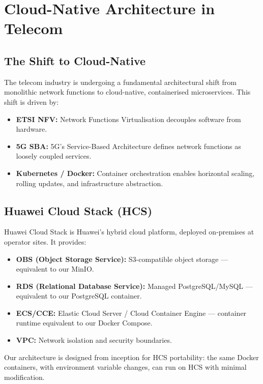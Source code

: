\section{Cloud-Native Architecture in Telecom}

\subsection{The Shift to Cloud-Native}

The telecom industry is undergoing a fundamental architectural shift from monolithic network functions to cloud-native, containerised microservices. This shift is driven by:

\begin{itemize}
  \item \textbf{ETSI NFV:} Network Functions Virtualisation decouples software from hardware.
  \item \textbf{5G SBA:} 5G's Service-Based Architecture defines network functions as loosely coupled services.
  \item \textbf{Kubernetes / Docker:} Container orchestration enables horizontal scaling, rolling updates, and infrastructure abstraction.
\end{itemize}

\subsection{Huawei Cloud Stack (HCS)}

Huawei Cloud Stack is Huawei's hybrid cloud platform, deployed on-premises at operator sites. It provides:

\begin{itemize}
  \item \textbf{OBS (Object Storage Service):} S3-compatible object storage --- equivalent to our MinIO.
  \item \textbf{RDS (Relational Database Service):} Managed PostgreSQL/MySQL --- equivalent to our PostgreSQL container.
  \item \textbf{ECS/CCE:} Elastic Cloud Server / Cloud Container Engine --- container runtime equivalent to our Docker Compose.
  \item \textbf{VPC:} Network isolation and security boundaries.
\end{itemize}

Our architecture is designed from inception for HCS portability: the same Docker containers, with environment variable changes, can run on HCS with minimal modification.

